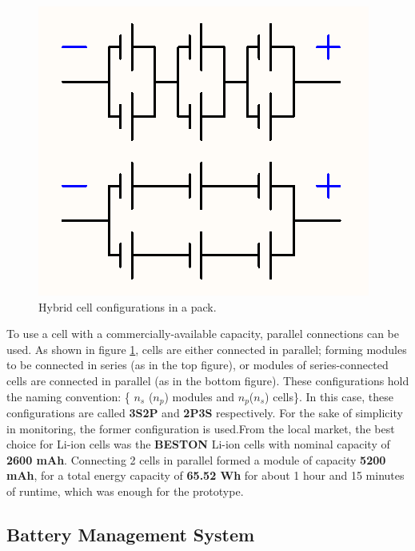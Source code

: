 \begin{figure}[h!]
    \centering
    \includegraphics[scale=0.5]{./Figures/HW/cell-configs.png}
    \caption{Hybrid cell configurations in a pack.}
    \label{fig:hw-cell-config}
\end{figure}


To use a cell with a commercially-available capacity, parallel connections can be used. As shown in figure \ref{fig:hw-cell-config}, cells are either connected in parallel; forming modules to be connected in series (as in the top figure), or modules of series-connected cells are connected in parallel (as in the bottom figure). These configurations hold the naming convention: \{ $n_s$ ($n_p$) modules and $n_p$($n_s$) cells\}. In this case, these configurations are called \textbf{3S2P} and \textbf{2P3S} respectively. For the sake of simplicity in monitoring, the former configuration is used.\newline From the local market, the best choice for Li-ion cells was the \textbf{BESTON} Li-ion cells with nominal capacity of \textbf{2600 mAh}. Connecting 2 cells in parallel formed a module of capacity \textbf{5200 mAh}, for a total energy capacity of \textbf{65.52 Wh} for about 1 hour and 15 minutes of runtime, which was enough for the prototype.
\subsection{Battery Management System}
\label{sec:bat-man}


